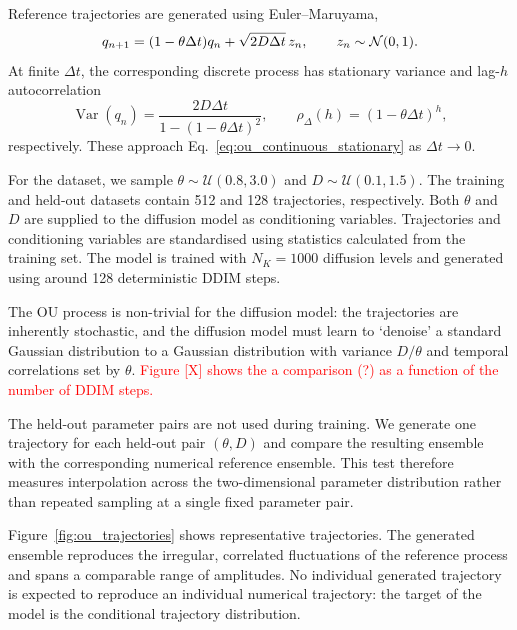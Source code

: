Reference trajectories are generated using Euler--Maruyama,
\begin{equation}
    q_{n+1}
    =
    (1-\theta\Delta t)q_n
    +
    \sqrt{2D\Delta t}\,z_n,
    \qquad
    z_n\sim\mathcal{N}(0,1).
    \label{eq:ou_euler_update}
\end{equation}
At finite $\Delta t$, the corresponding discrete process has stationary variance and lag-$h$ autocorrelation
\begin{equation}
    \operatorname{Var}(q_n)
    =
    \frac{2D\Delta t}
    {1-(1-\theta\Delta t)^2},
    \qquad
    \rho_\Delta(h)
    =
    (1-\theta\Delta t)^h,
    \label{eq:ou_discrete_stationary}
\end{equation}
respectively. These approach Eq.~\eqref{eq:ou_continuous_stationary} as $\Delta t\rightarrow0$.

For the dataset, we sample $\theta\sim\mathcal{U}(0.8,3.0)$ and $D\sim\mathcal{U}(0.1,1.5)$. The training and held-out datasets contain 512 and 128 trajectories, respectively. Both $\theta$ and $D$ are supplied to the diffusion model as conditioning variables. Trajectories and conditioning variables are standardised using statistics calculated from the training set. The model is trained with $N_K=1000$ diffusion levels and generated using around 128 deterministic DDIM steps. 

The OU process is non-trivial for the diffusion model: the trajectories are inherently stochastic, and the diffusion model must learn to `denoise' a standard Gaussian distribution to a Gaussian distribution with variance $D/\theta$ and temporal correlations set by $\theta$. \textcolor{red}{Figure [X] shows the a comparison (?) as a function of the number of DDIM steps.}

The held-out parameter pairs are not used during training. We generate one trajectory for each held-out pair $(\theta,D)$ and compare the resulting ensemble with the corresponding numerical reference ensemble. This test therefore measures interpolation across the two-dimensional parameter distribution rather than repeated sampling at a single fixed parameter pair.

Figure~\ref{fig:ou_trajectories} shows representative trajectories. The generated ensemble reproduces the irregular, correlated fluctuations of the reference process and spans a comparable range of amplitudes. No individual generated trajectory is expected to reproduce an individual numerical trajectory: the target of the model is the conditional trajectory distribution.

